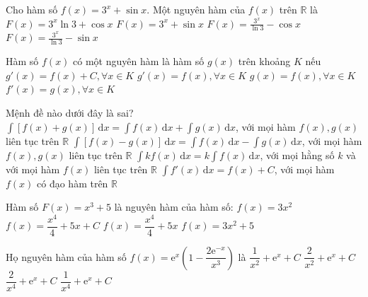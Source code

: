 \begin{ex}
Cho hàm số $f(x) = 3^x + \sin x$. Một nguyên hàm của $f(x)$ trên $\mathbb{R}$ là
 \choice
 {$F(x) = 3^x \ln 3 + \cos x$}
 {$F(x) = 3^x + \sin x$}
 {\True $F(x) = \frac{3^x}{\ln 3} - \cos x$}
 {$F(x) = \frac{3^x}{\ln 3} - \sin x$}
\end{ex}
\begin{ex}%
 Hàm số $f(x)$ có một nguyên hàm là hàm số $g(x)$ trên khoảng $K$ nếu
 \choice
 {$g'(x)=f(x)+C, \forall x \in K$}
 {\True $g'(x)=f(x), \forall x \in K$}
 {$g(x)=f(x), \forall x \in K$}
 {$f'(x)=g(x), \forall x \in K$}
\end{ex}
\begin{ex}%
 Mệnh đề nào dưới đây là sai?
 \choice
 {$\displaystyle\int [f(x)+g(x)]\,\text{d}x=\int f(x)\,\text{d}x+\int g(x)\,\text{d}x$, với mọi hàm $f(x), g(x)$ liên tục trên $\mathbb{R}$}
 {$\displaystyle\int [f(x)-g(x)]\,\text{d}x=\int f(x)\,\text{d}x-\int g(x)\,\text{d}x$, với mọi hàm $f(x), g(x)$ liên tục trên $\mathbb{R}$}
 {\True $\displaystyle\int kf(x)\,\text{d}x=k\int f(x)\,\text{d}x$, với mọi hằng số $k$ và với mọi hàm $f(x)$ liên tục trên $\mathbb{R}$}
 {$\displaystyle\int f'(x)\,\text{d}x=f(x)+C$, với mọi hàm $f(x)$ có đạo hàm trên $\mathbb{R}$}
\end{ex}
\begin{ex}%
 Hàm số $F(x)=x^3+5$ là nguyên hàm của hàm số:
 \choice
 {\True $f(x)=3x^2$}
 {$f(x)=\dfrac{x^4}{4}+5x+C$}
 {$f(x)=\dfrac{x^4}{4}+5x$}
 {$f(x)=3x^2+5$}
\end{ex}
\begin{ex}%
    Họ nguyên hàm của hàm số $f(x)= \mathrm{e}^x \left(1- \dfrac{2\mathrm{e}^{-x}}{x^3} \right)$ là
    \choice
    {\True $\dfrac{1}{x^2}+\mathrm{e}^x+C$}
    {$\dfrac{2}{x^2}+\mathrm{e}^x+C$}
    {$\dfrac{2}{x^4}+\mathrm{e}^x+C$}
    {$\dfrac{1}{x^4}+\mathrm{e}^x+C$}
\end{ex}
